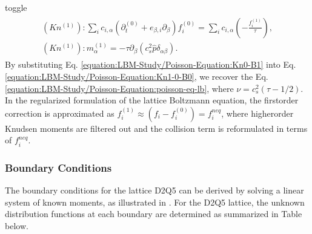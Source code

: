 \documentclass[letterpaper,10pt,english,openany,oneside]{jupyterBook}
\begin{document}
\begin{sphinxuseclass}{toggle}
\begin{equation}\label{equation:LBM-Study/Poisson-Equation:Kn0-B1}
\begin{split}
\begin{array}{l}
(Kn^{(1)}): \displaystyle\sum_{i}c_{i,\alpha}\left( \partial_{t}^{(0)} + e_{\beta,i}\partial_{\beta} \right)f_{i}^{(0)}= \displaystyle\sum_{i} c_{i,\alpha} \left( -\frac{f_{i}^{(1)}}{\tau}  \right),\\
(Kn^{(1)}): m^{(1)}_{\alpha} =-\tau \partial_{\beta}\left( c_{s}^{2} \widehat{p} \delta_{\alpha\beta}  \right).
\end{array}
\end{split}
\end{equation}
\sphinxAtStartPar
By substituting Eq. \eqref{equation:LBM-Study/Poisson-Equation:Kn0-B1} into Eq. \eqref{equation:LBM-Study/Poisson-Equation:Kn1-0-B0}, we recover the Eq. \eqref{equation:LBM-Study/Poisson-Equation:poisson-eq-lb}, where \(\nu=c_{s}^{2}(\tau-1/2)\). In the regularized formulation of the lattice Boltzmann equation, the first\sphinxhyphen{}order correction is approximated as \(f_{i}^{(1)}\approx (f_{i}-f_{i}^{(0)})=f_{i}^{neq}\), where higher\sphinxhyphen{}order Knudsen moments are filtered out and the collision term is reformulated in terms of \(f_{i}^{neq}\).

\end{sphinxuseclass}

\subsubsection{Boundary Conditions}
\label{\detokenize{LBM-Study/Poisson-Equation:boundary-conditions}}
\sphinxAtStartPar
The boundary conditions for the lattice D2Q5 can be derived by solving a linear system of known moments, as illustrated in . For the D2Q5 lattice, the unknown distribution functions at each boundary are determined as summarized in Table below.
\end{document}
